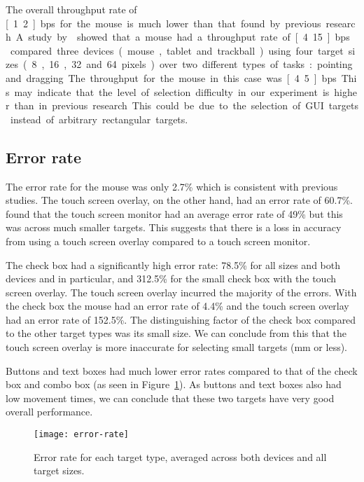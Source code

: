 \documentclass{elsart}
\begin{document}
The overall throughput rate of \unit[1.2]{bps} for the mouse is much
lower than that found by previous research. A study by
\citet{Doug-SA-1994-SIGCHI} showed that a mouse had a throughput rate of
\unit[4.15]{bps}. \citet{Mack-IS-1991} compared three devices (mouse,
tablet and trackball) using four target sizes (8, 16, 32 and 64 pixels)
over two different types of tasks: pointing and dragging. The throughput
for the mouse in this case was \unit[4.5]{bps}. This may indicate that
the level of selection difficulty in our experiment is higher than in
previous research. This could be due to the selection of GUI targets
instead of arbitrary rectangular targets.


\subsection{Error rate}
\label{sec-results-error-rate}

The error rate for the mouse was only 2.7\% which is consistent with
previous studies. The touch screen overlay, on the other hand, had an
error rate of 60.7\%. \citet{Sear-A-1991-IJMMS} found that the touch
screen monitor had an average error rate of 49\% but this was across
much smaller targets. This suggests that there is a loss in accuracy
from using a touch screen overlay compared to a touch screen monitor.

The check box had a significantly high error rate: 78.5\% for all sizes
and both devices and in particular, and 312.5\% for the small check box
with the touch screen overlay. The touch screen overlay incurred the
majority of the errors. With the check box the mouse had an error rate
of 4.4\% and the touch screen overlay had an error rate of 152.5\%. The
distinguishing factor of the check box compared to the other target
types was its small size. We can conclude from this that the touch
screen overlay is more inaccurate for selecting small targets
(\unit[4]{mm} or less).

Buttons and text boxes had much lower error rates compared to that of
the check box and combo box (as seen in Figure~\ref{fig-error-rate}). As
buttons and text boxes also had low movement times, we can conclude that
these two targets have very good overall performance.


\begin{figure}
	\centering
	\texttt{[image: error-rate]}
	\caption{Error rate for each target type, averaged across both
	devices and all target sizes.}
	\label{fig-error-rate}
\end{figure}
\end{document}
